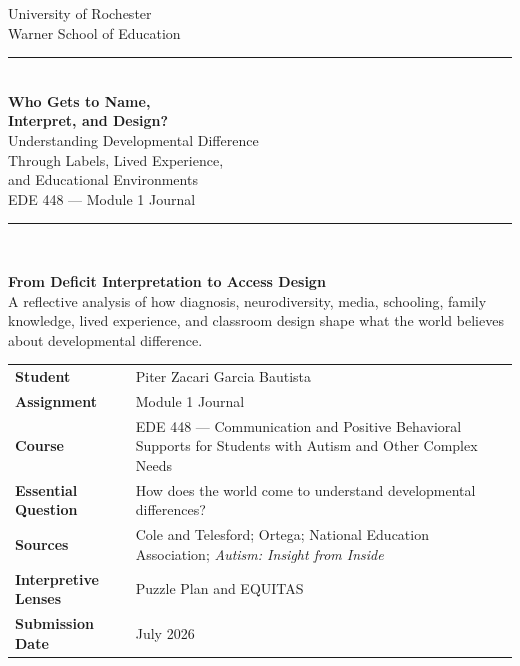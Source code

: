 \documentclass[11pt]{article}
\begin{document}
\hypersetup{pageanchor=false}
\begin{titlepage}
\thispagestyle{empty}

\begin{center}
{\large University of Rochester\\}
{\normalsize Warner School of Education\\[0.15in]}

{\color{PrimaryRed}\rule{\textwidth}{1.4pt}}\\[0.12in]
{\Huge\bfseries Who Gets to Name,\\[0.07in]
Interpret, and Design?}\\[0.15in]
{\huge Understanding Developmental Difference\\[0.07in]
Through Labels, Lived Experience,\\[0.07in]
and Educational Environments}\\[0.18in]
{\Large EDE 448 --- Module 1 Journal}\\[0.12in]

\vfill

{\color{PrimaryRed}\rule{0.78\textwidth}{0.7pt}}\\[0.22in]

\colorbox{SoftBlue}{%
\parbox{0.88\textwidth}{%
\centering\small\vspace{0.02in}
\textbf{From Deficit Interpretation to Access Design}\\[0.05in]
A reflective analysis of how diagnosis, neurodiversity, media, schooling, family knowledge, lived experience, and classroom design shape what the world believes about developmental difference.
}%
}
\end{center}

\vfill

\begin{center}
\renewcommand{\arraystretch}{1.18}
\setlength{\tabcolsep}{4pt}
\begin{tabular}{>{\bfseries\RaggedLeft}p{1.65in} p{5.0in}}
Student & Piter Zacari Garcia Bautista \\
Assignment & Module 1 Journal \\
Course & EDE 448 --- Communication and Positive Behavioral Supports for Students with Autism and Other Complex Needs \\
Essential Question & How does the world come to understand developmental differences? \\
Sources & Cole and Telesford; Ortega; National Education Association; \textit{Autism: Insight from Inside} \\
Interpretive Lenses & Puzzle Plan and EQUITAS \\
Submission Date & July 2026 \\
\end{tabular}
\end{center}


\end{titlepage}
\end{document}
